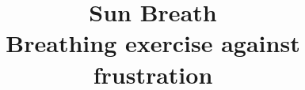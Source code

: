 
\graphicspath{{images/}} %


\title{Sun Breath \\ Breathing exercise against frustration} %



\begin{frame}
\titlepage %
\end{frame}





 